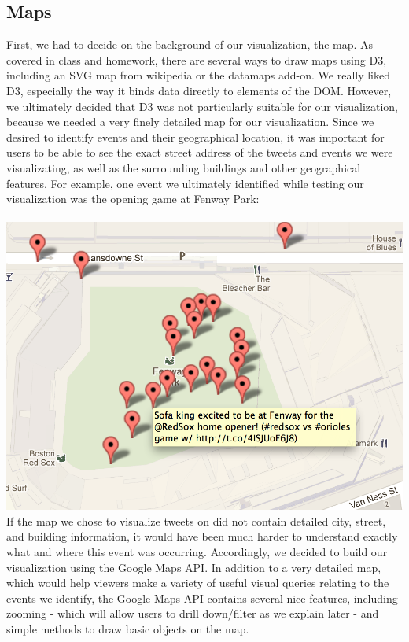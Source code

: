 \documentclass[pdftex,12pt,a4paper]{article}
\begin{document}
\subsection{Maps}
First, we had to decide on the background of our visualization, the map. As covered in class and homework, there are several ways to draw maps using D3, including an SVG map from wikipedia or the datamaps add-on. We really liked D3, especially the way it binds data directly to elements of the DOM. However, we ultimately decided that D3 was not particularly suitable for our visualization, because we needed a very finely detailed map for our visualization. Since we desired to identify events and their geographical location, it was important for users to be able to see the exact street address of the tweets and events we were visualizating, as well as the surrounding buildings and other geographical features. For example, one event we ultimately identified while testing our visualization was the opening game at Fenway Park: \\ \\
\includegraphics[width=5.5in]{fenway.png} \\
If the map we chose to visualize tweets on did not contain detailed city, street, and building information, it would have been much harder to understand exactly what and where this event was occurring.
Accordingly, we decided to build our visualization using the Google Maps API. In addition to a very detailed map, which would help viewers make a variety of useful visual queries relating to the events we identify, the Google Maps API contains several nice features, including zooming - which will allow users to drill down/filter as we explain later - and simple methods to draw basic objects on the map. 
\end{document}
